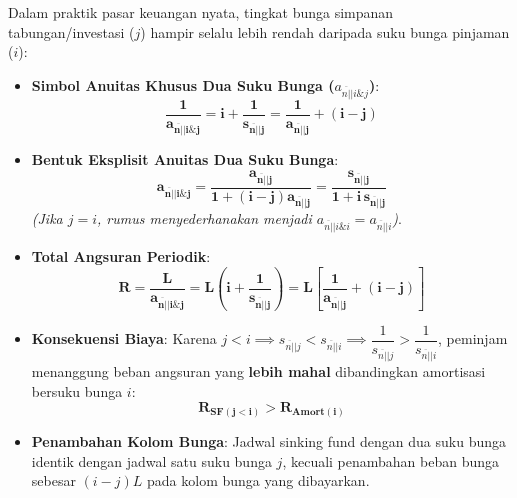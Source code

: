 \documentclass[10pt,a4paper]{article}
\newcommand{\angl}[1]{\overline{#1|}}
\begin{document}
\begin{rumusbox}
Dalam praktik pasar keuangan nyata, tingkat bunga simpanan tabungan/investasi ($j$) hampir selalu lebih rendah daripada suku bunga pinjaman ($i$):
\begin{itemize}[leftmargin=1.5em, topsep=1.5pt, itemsep=2pt]
    \item \textbf{Simbol Anuitas Khusus Dua Suku Bunga ($a_{\angl{n}|i \& j}$)}:
    \begin{equation*}
        \mathbf{\frac{1}{a_{\angl{n}|i \& j}} = i + \frac{1}{s_{\angl{n}|j}} = \frac{1}{a_{\angl{n}|j}} + (i - j)}
    \end{equation*}
    \item \textbf{Bentuk Eksplisit Anuitas Dua Suku Bunga}:
    \begin{equation*}
        \mathbf{a_{\angl{n}|i \& j} = \frac{a_{\angl{n}|j}}{1 + (i - j) a_{\angl{n}|j}} = \frac{s_{\angl{n}|j}}{1 + i \, s_{\angl{n}|j}}}
    \end{equation*}
    \textit{(Jika $j = i$, rumus menyederhanakan menjadi $a_{\angl{n}|i \& i} = a_{\angl{n}|i}$)}.
    \item \textbf{Total Angsuran Periodik}:
    \begin{equation*}
        \mathbf{R = \frac{L}{a_{\angl{n}|i \& j}} = L \left( i + \frac{1}{s_{\angl{n}|j}} \right) = L \left[ \frac{1}{a_{\angl{n}|j}} + (i - j) \right]}
    \end{equation*}
    \item \textbf{Konsekuensi Biaya}: Karena $j < i \implies s_{\angl{n}|j} < s_{\angl{n}|i} \implies \dfrac{1}{s_{\angl{n}|j}} > \dfrac{1}{s_{\angl{n}|i}}$, peminjam menanggung beban angsuran yang \textbf{lebih mahal} dibandingkan amortisasi bersuku bunga $i$:
    \begin{equation*}
        \mathbf{R_{\text{SF}(j < i)} > R_{\text{Amort}(i)}}
    \end{equation*}
    \item \textbf{Penambahan Kolom Bunga}: Jadwal sinking fund dengan dua suku bunga identik dengan jadwal satu suku bunga $j$, kecuali penambahan beban bunga sebesar $(i - j)L$ pada kolom bunga yang dibayarkan.
\end{itemize}
\end{rumusbox}
\end{document}
